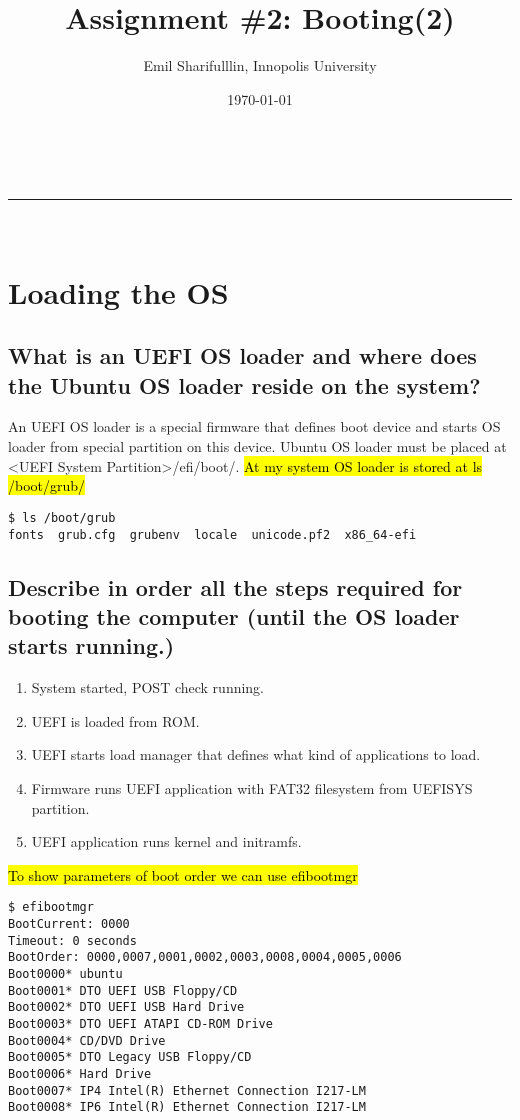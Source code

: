 \documentclass[a4paper,11pt]{article}
\makeatletter
\newcommand*{\TitleFont}{%
      \usefont{\encodingdefault}{\rmdefault}{b}{n}%
      \fontsize{16}{20}%
      \selectfont}
\newcommand{\linia}{\rule{\linewidth}{0.5pt}}
\theoremstyle{mytheor}
\renewcommand{\maketitle}{
\begin{center}
\vspace{2ex}
{\huge \textsc{\@title}}
\vspace{1ex}
\\
\linia\\
\@author \hfill \@date
\vspace{4ex}
\end{center}
}
\makeatother
\begin{document}
\title{\TitleFont Assignment \#2: Booting(2) }

\author{Emil Sharifulllin, Innopolis University}

\date{\today}

\maketitle

\section{Loading the OS}
\subsection{What is an UEFI OS loader and where does the Ubuntu OS loader reside on the system?}
An UEFI OS loader is a special firmware that defines boot device and starts OS loader from special partition on this device. Ubuntu OS loader must be placed at <UEFI System Partition>/efi/boot/. \hl{At my system OS loader is stored at  ls /boot/grub/}

\begin{lstlisting}
$ ls /boot/grub
fonts  grub.cfg  grubenv  locale  unicode.pf2  x86_64-efi
\end{lstlisting}

\subsection{Describe in order all the steps required for booting the computer (until the OS loader starts running.)}

\begin{enumerate}
    \item System started, POST check running.
    \item UEFI is loaded from ROM.
    \item UEFI starts load manager that defines what kind of applications to load.
    \item Firmware runs UEFI application with FAT32 filesystem from UEFISYS partition.
    \item UEFI application runs kernel and initramfs.
\end{enumerate}

\hl{To show parameters of boot order we can use efibootmgr}

\begin{lstlisting}
$ efibootmgr 
BootCurrent: 0000
Timeout: 0 seconds
BootOrder: 0000,0007,0001,0002,0003,0008,0004,0005,0006
Boot0000* ubuntu
Boot0001* DTO UEFI USB Floppy/CD
Boot0002* DTO UEFI USB Hard Drive
Boot0003* DTO UEFI ATAPI CD-ROM Drive
Boot0004* CD/DVD Drive 
Boot0005* DTO Legacy USB Floppy/CD
Boot0006* Hard Drive
Boot0007* IP4 Intel(R) Ethernet Connection I217-LM
Boot0008* IP6 Intel(R) Ethernet Connection I217-LM
\end{lstlisting}
\end{document}
